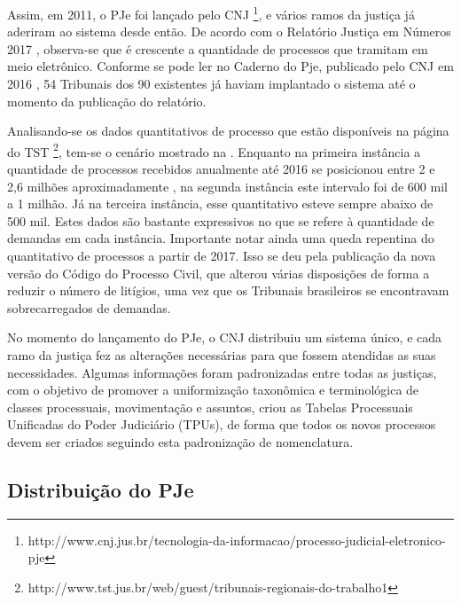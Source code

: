 Assim, em 2011, o PJe foi lançado pelo CNJ \footnote{http://www.cnj.jus.br/tecnologia-da-informacao/processo-judicial-eletronico-pje}, e vários ramos da justiça já aderiram ao sistema desde então. De acordo com o Relatório Justiça em Números 2017 \cite{justicaemnumeros2017}, observa-se que é crescente a quantidade de processos que tramitam em meio eletrônico.  Conforme se pode ler no Caderno do Pje, publicado pelo CNJ em 2016 \cite{cadernopje2016}, 54 Tribunais dos 90 existentes já haviam implantado o sistema até o momento da publicação do relatório.   

Analisando-se os dados quantitativos de processo que estão disponíveis na página do TST \footnote{http://www.tst.jus.br/web/guest/tribunais-regionais-do-trabalho1}, tem-se o cenário mostrado na . Enquanto na primeira instância a quantidade de processos recebidos anualmente até 2016 se posicionou entre 2 e 2,6 milhões aproximadamente , na segunda instância este intervalo foi de 600 mil a 1 milhão. Já na terceira instância, esse quantitativo esteve sempre abaixo de 500 mil. Estes dados são bastante expressivos no que se refere à quantidade de demandas em cada instância. Importante notar ainda uma queda repentina do quantitativo de processos a partir de 2017. Isso se deu pela publicação da nova versão do Código do Processo Civil\cite{novocpc}, que alterou várias disposições de forma a reduzir o número de litígios, uma vez que os Tribunais brasileiros se encontravam sobrecarregados de demandas.


%


No momento do lançamento do PJe, o CNJ distribuiu um sistema único, e cada ramo da justiça fez as alterações necessárias para que fossem atendidas as suas necessidades. Algumas informações foram padronizadas entre todas as justiças, com o objetivo de promover a  uniformização taxonômica e terminológica de classes processuais, movimentação e assuntos, criou as  Tabelas Processuais Unificadas do Poder Judiciário (TPUs), de forma que todos os novos processos devem ser criados seguindo esta padronização de nomenclatura.


\subsection{\label{sec:distribuicaoPje}Distribuição do PJe}%

